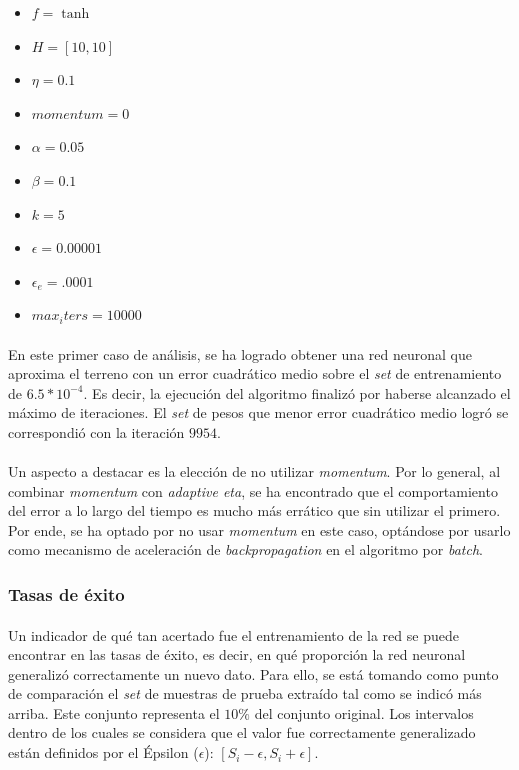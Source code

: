 \documentclass[12pt, twocolumn]{article}
\begin{document}
	\begin{itemize}
		\item $f = \tanh$
		\item $H = \left[10, 10\right]$
		\item $\eta = 0.1$
		\item $momentum = 0$
		\item $\alpha = 0.05$
		\item $\beta = 0.1$
		\item $k = 5$
		\item $\epsilon = 0.00001$
		\item $\epsilon_{e} = .0001$
		\item $max_iters = 10000$
	\end{itemize}
	
	\paragraph{} En este primer caso de análisis, se ha logrado obtener una red neuronal que aproxima el terreno con un error cuadrático medio sobre el \textit{set} de entrenamiento de $6.5*10^{-4}$. Es decir, la ejecución del algoritmo finalizó por haberse alcanzado el máximo de iteraciones. El \textit{set} de pesos que menor error cuadrático medio logró se correspondió con la iteración $9954$.
	
	\paragraph{} Un aspecto a destacar es la elección de no utilizar \textit{momentum}. Por lo general, al combinar \textit{momentum} con \textit{adaptive eta}, se ha encontrado que el comportamiento del error a lo largo del tiempo es mucho más errático que sin utilizar el primero. Por ende, se ha optado por no usar \textit{momentum} en este caso, optándose por usarlo como mecanismo de aceleración de \textit{backpropagation} en el algoritmo por \textit{batch}.
	
	\subsubsection{Tasas de éxito}
	
	\paragraph{} Un indicador de qué tan acertado fue el entrenamiento de la red se puede encontrar en las tasas de éxito, es decir, en qué proporción la red neuronal generalizó correctamente un nuevo dato. Para ello, se está tomando como punto de comparación el \textit{set} de muestras de prueba extraído tal como se indicó más arriba. Este conjunto representa el $10\%$ del conjunto original. Los intervalos dentro de los cuales se considera que el valor fue correctamente generalizado están definidos por el Épsilon ($\epsilon$): $\left[S_{i}-\epsilon, S_{i}+\epsilon\right]$.  
	
\end{document}
